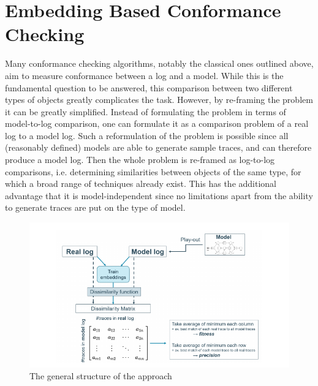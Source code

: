 \documentclass[runningheads]{template/llncs}
\begin{document}
\section{Embedding Based Conformance Checking}
\label{sec:method}
Many conformance checking algorithms, notably the classical ones outlined above, aim to measure conformance between a log and a model.
While this is the fundamental question to be answered, this comparison between two different types of objects greatly complicates the task.
However, by re-framing the problem it  can be greatly simplified.
Instead of formulating the problem in terms of model-to-log comparison, one can formulate it as a comparison problem of a real log to a model log.
Such a reformulation of the problem is possible since all (reasonably defined) models are able to generate sample traces, and can therefore produce a model log.
Then the whole problem is re-framed as log-to-log comparisons, i.e. determining similarities between objects of the same type, for which a broad range of techniques already exist.
This has the additional advantage that it is model-independent since no limitations apart from the ability to generate traces are put on the type of model.
\begin{figure}
	\includegraphics[width=1\textwidth]{figures/structure}
	\caption{The general structure of the approach}
	\label{fig:structure}
\end{figure}
\end{document}
